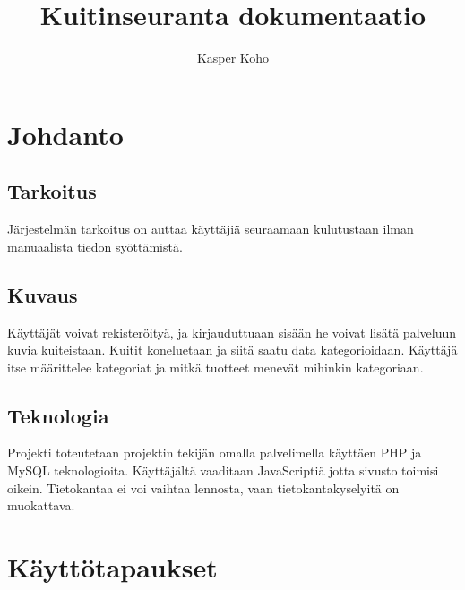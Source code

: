 \documentclass[a4paper]{article}
\begin{document}
	\title{Kuitinseuranta dokumentaatio}
	\author{Kasper Koho}
	\renewcommand{\today}{6. syyskuuta 2015}
	\maketitle
	
	\pagebreak
	
	\section{Johdanto}
	\subsection{Tarkoitus}
	Järjestelmän tarkoitus on auttaa käyttäjiä seuraamaan kulutustaan ilman manuaalista tiedon syöttämistä.
	
	\subsection{Kuvaus}
	Käyttäjät voivat rekisteröityä, ja kirjauduttuaan sisään he voivat lisätä palveluun kuvia kuiteistaan. Kuitit koneluetaan ja siitä saatu data kategorioidaan.\newline
	Käyttäjä itse määrittelee kategoriat ja mitkä tuotteet menevät mihinkin kategoriaan.
	
	\subsection{Teknologia}
	Projekti toteutetaan projektin tekijän omalla palvelimella käyttäen PHP ja MySQL teknologioita. Käyttäjältä vaaditaan JavaScriptiä jotta sivusto toimisi oikein. Tietokantaa ei voi vaihtaa lennosta, vaan tietokantakyselyitä on muokattava.
	
	\section{Käyttötapaukset}
\end{document}
